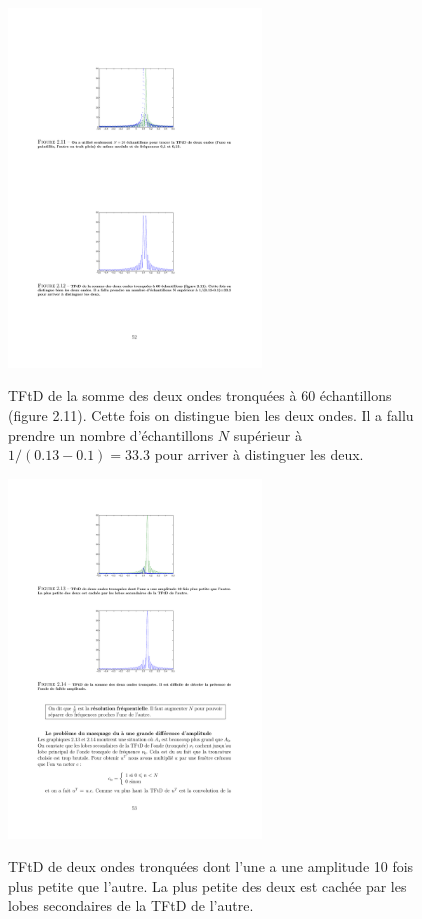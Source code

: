 \begin{definition}
\begin{figure}
  \centering
  \includegraphics[width=0.6\textwidth]{Figures/Figure2-12}\\
  \caption{TFtD de la somme des deux ondes tronqu\'{e}es \`{a} 60 \'{e}chantillons (figure 2.11). Cette fois on distingue bien les deux ondes. Il a fallu prendre un nombre d'\'{e}chantillons $N$ sup\'{e}rieur \`{a} $1/(0.13-0.1)=33.3$ pour arriver \`{a} distinguer les deux.}\label{fig:figure2-12}
\end{figure}


\begin{figure}
  \centering
  \includegraphics[width=0.6\textwidth]{Figures/Figure2-13}\\
  \caption{TFtD de deux ondes tronqu\'{e}es dont l'une a une amplitude 10 fois plus petite que l'autre. La plus petite des deux est cach\'{e}e par les lobes secondaires de la TFtD de l'autre.}\label{fig:figure2-13}
\end{figure}



\end{definition}
